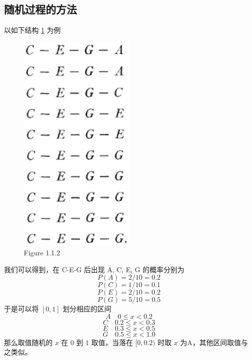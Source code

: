 \documentclass[11pt]{article}
\begin{document}
\subsection{随机过程的方法}
以如下结构 \ref{fig:1.1.2} 为例
\begin{figure}[hptb]
	\centering
	\label{fig:1.1.2}
	\includegraphics[width=0.5\textwidth]{pic/1.1.2.eps}
	\caption{Figure 1.1.2}
\end{figure}	
我们可以得到，在 C-E-G 后出现 A, C, E, G 的概率分别为
$$ P(A) = 2/10 = 0.2 $$
$$ P(C) = 1/10 = 0.1 $$
$$ P(E) = 2/10 = 0.2 $$
$$ P(G) = 5/10 = 0.5 $$
于是可以将 $[0, 1]$ 划分相应的区间
$$ A \quad 0 \le x < 0.2 $$
$$ C \quad 0.2 \le x < 0.3 $$
$$ E \quad 0.3 \le x < 0.5 $$
$$ G \quad 0.5 \le x < 1.0 $$
那么取值随机的 $x$ 在 $0$ 到 $1$ 取值，当落在 $[0, 0.2)$ 时取 $x$ 为A，其他区间取值与之类似。
\end{document}
